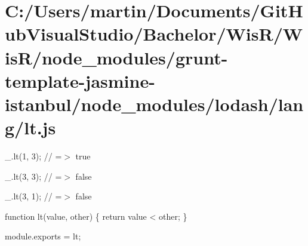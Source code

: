 \hypertarget{_c_1_2_users_2martin_2_documents_2_git_hub_visual_studio_2_bachelor_2_wis_r_2_wis_r_2node_module1753c01d35c34030d3e17eaea259477f}{}\section{C\+:/\+Users/martin/\+Documents/\+Git\+Hub\+Visual\+Studio/\+Bachelor/\+Wis\+R/\+Wis\+R/node\+\_\+modules/grunt-\/template-\/jasmine-\/istanbul/node\+\_\+modules/lodash/lang/lt.\+js}
\+\_\+.\+lt(1, 3); // =$>$ true

\+\_\+.\+lt(3, 3); // =$>$ false

\+\_\+.\+lt(3, 1); // =$>$ false


\begin{DoxyCodeInclude}

\textcolor{keyword}{function} lt(value, other) \{
  \textcolor{keywordflow}{return} value < other;
\}

module.exports = lt;
\end{DoxyCodeInclude}
 
